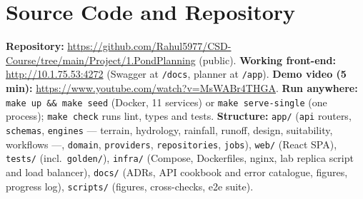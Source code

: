 \documentclass[manuscript,screen,review]{acmart}
\newcommand{\repourl}{https://github.com/Rahul5977/CSD-Course/tree/main/Project/1.PondPlanning}
\newcommand{\appurl}{http://10.1.75.53:4272}
\newcommand{\videourl}{\url{https://www.youtube.com/watch?v=MsWABr4THGA}}
\begin{document}
\section{Source Code and Repository}
\textbf{Repository:} \url{\repourl} (public). \textbf{Working front-end:} \url{\appurl}
(Swagger at \texttt{/docs}, planner at \texttt{/app}). \textbf{Demo video (5 min):} \videourl.
\textbf{Run anywhere:} \texttt{make up \&\& make seed} (Docker, 11 services) or
\texttt{make serve-single} (one process); \texttt{make check} runs lint, types and tests.
\textbf{Structure:} \texttt{app/} (\texttt{api} routers, \texttt{schemas}, \texttt{engines}
--- terrain, hydrology, rainfall, runoff, design, suitability, workflows ---, \texttt{domain},
\texttt{providers}, \texttt{repositories}, \texttt{jobs}), \texttt{web/} (React SPA),
\texttt{tests/} (incl.\ \texttt{golden/}), \texttt{infra/} (Compose, Dockerfiles, nginx, lab
replica script and load balancer), \texttt{docs/} (ADRs, API cookbook and error catalogue,
figures, progress log), \texttt{scripts/} (figures, cross-checks, e2e suite).

\clearpage
\end{document}
